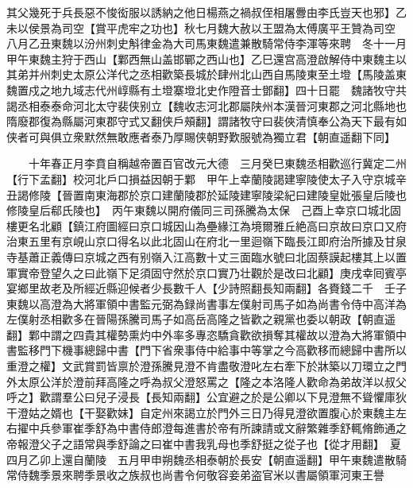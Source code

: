 其父幾死于兵長惡不悛衒服以誘納之他日楊燕之禍叔侄相屠釁由李氏豈天也邪】乙未以侯景為司空【賞平虎牢之功也】秋七月魏大赦以王盟為太傅廣平王贊為司空　八月乙丑東魏以汾州刺史斛律金為大司馬東魏遣兼散騎常侍李渾等來聘　冬十一月甲午東魏主狩于西山【鄴西無山盖邯鄲之西山也】乙巳還宫高澄啟解侍中東魏主以其弟并州刺史太原公洋代之丞相歡築長城於肆州北山西自馬陵東至土墱【馬陵盖東魏置戍之地九域志代州崞縣有土墱寨墱北史作隥音士鄧翻】四十日罷　魏諸牧守共謁丞相泰泰命河北太守裴侠别立【魏收志河北郡屬陕州本漢晉河東郡之河北縣地也隋廢郡復為縣屬河東郡守式又翻侠戶頰翻】謂諸牧守曰裴俠清慎奉公為天下最有如侠者可與俱立衆默然無敢應者泰乃厚賜侠朝野歎服號為獨立君【朝直遥翻下同】

　　十年春正月李賁自稱越帝置百官改元大德　三月癸巳東魏丞相歡巡行冀定二州【行下孟翻】校河北戶口損益因朝于鄴　甲午上幸蘭陵謁建寧陵使太子入守京城辛丑謁修陵【晉置南東海郡於京口建蘭陵郡於延陵建寧陵梁紀曰建陵皇妣張皇后陵也修陵皇后郗氏陵也】　丙午東魏以開府儀同三司孫騰為太保　己酉上幸京口城北固樓更名北顧【鎮江府圖經曰京口城因山為壘緣江為境爾雅丘絶高曰京故曰京口又府治東五里有京峴山京口得名以此北固山在府北一里迴嶺下臨長江即府治所據及甘泉寺基蕭正義傳曰京城之西有别嶺入江高數十丈三面臨水號曰北固蔡謨起樓其上以置軍實帝登望久之曰此嶺下足須固守然於京口實乃壮觀於是改曰北顧】庚戌幸囘賓亭宴鄉里故老及所經近縣迎候者少長數千人【少詩照翻長知兩翻】各賚錢二千　壬子東魏以高澄為大將軍領中書監元弼為録尚書事左僕射司馬子如為尚書令侍中高洋為左僕射丞相歡多在晉陽孫騰司馬子如高岳高隆之皆歡之親黨也委以朝政【朝直遥翻】鄴中謂之四貴其權勢熏灼中外率多專恣驕貪歡欲損奪其權故以澄為大將軍領中書監移門下機事總歸中書【門下省衆事侍中給事中等掌之今高歡移而總歸中書所以重澄之權】文武賞罰皆禀於澄孫騰見澄不肯盡敬澄叱左右牽下於牀築以刀環立之門外太原公洋於澄前拜高隆之呼為叔父澄怒罵之【隆之本洛隆人歡命為弟故洋以叔父呼之】歡謂羣公曰兒子浸長【長知兩翻】公宜避之於是公卿以下見澄無不聳懼庫狄干澄姑之婿也【干娶歡妹】自定州來謁立於門外三日乃得見澄欲置腹心於東魏主左右擢中兵參軍崔季舒為中書侍郎澄每進書於帝有所諫請或文辭繁雜季舒輒脩飾通之帝報澄父子之語常與季舒論之曰崔中書我乳母也季舒挺之從子也【從才用翻】　夏四月乙卯上還自蘭陵　五月甲申朔魏丞相泰朝於長安【朝直遥翻】甲午東魏遣散騎常侍魏季景來聘季景收之族叔也尚書令何敬容妾弟盗官米以書屬領軍河東王譽

